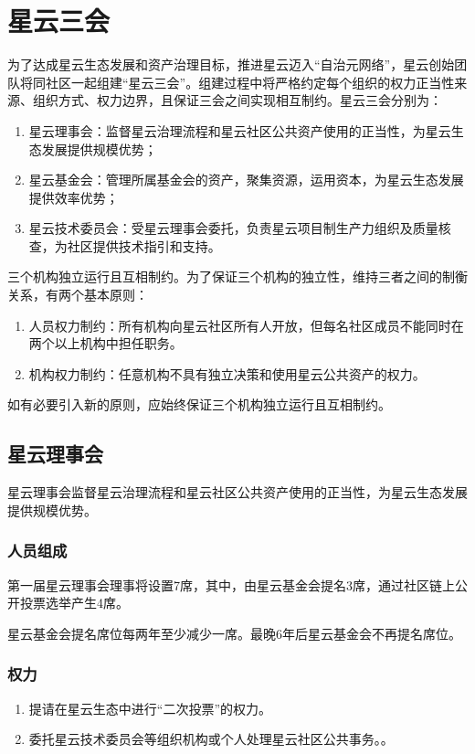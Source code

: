 \section{星云三会}

为了达成星云生态发展和资产治理目标，推进星云迈入“自治元网络”，星云创始团队将同社区一起组建“星云三会”。组建过程中将严格约定每个组织的权力正当性来源、组织方式、权力边界，且保证三会之间实现相互制约。星云三会分别为：
\begin{enumerate}
	\item 星云理事会：监督星云治理流程和星云社区公共资产使用的正当性，为星云生态发展提供规模优势；
	\item 星云基金会：管理所属基金会的资产，聚集资源，运用资本，为星云生态发展提供效率优势；
	\item 星云技术委员会：受星云理事会委托，负责星云项目制生产力组织及质量核查，为社区提供技术指引和支持。
\end{enumerate}
三个机构独立运行且互相制约。为了保证三个机构的独立性，维持三者之间的制衡关系，有两个基本原则：
\begin{enumerate}
	\item 人员权力制约：所有机构向星云社区所有人开放，但每名社区成员不能同时在两个以上机构中担任职务。
	\item 机构权力制约：任意机构不具有独立决策和使用星云公共资产的权力。
\end{enumerate}
如有必要引入新的原则，应始终保证三个机构独立运行且互相制约。

\subsection{星云理事会}
星云理事会监督星云治理流程和星云社区公共资产使用的正当性，为星云生态发展提供规模优势。

\subsubsection{人员组成}

第一届星云理事会理事将设置7席，其中，由星云基金会提名3席，通过社区链上公开投票选举产生4席。

星云基金会提名席位每两年至少减少一席。最晚6年后星云基金会不再提名席位。

\subsubsection{权力}
\begin{enumerate}
	\item 提请在星云生态中进行“二次投票”的权力。
	\item 委托星云技术委员会等组织机构或个人处理星云社区公共事务。。
\end{enumerate}


